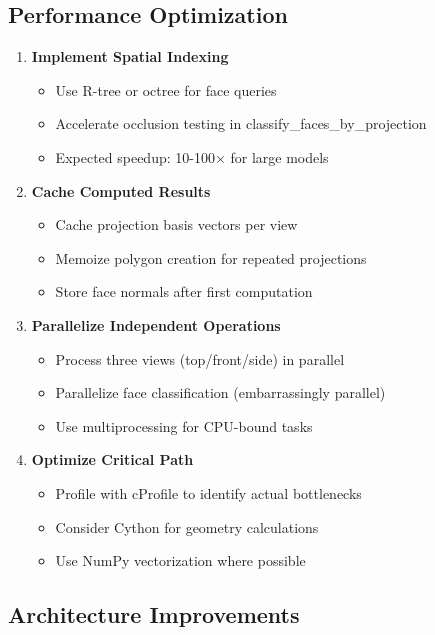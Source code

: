 \documentclass[11pt,a4paper]{article}
\begin{document}
\subsection{Performance Optimization}

\begin{enumerate}
    \item \textbf{Implement Spatial Indexing}
    \begin{itemize}
        \item Use R-tree or octree for face queries
        \item Accelerate occlusion testing in classify\_faces\_by\_projection
        \item Expected speedup: 10-100× for large models
    \end{itemize}
    
    \item \textbf{Cache Computed Results}
    \begin{itemize}
        \item Cache projection basis vectors per view
        \item Memoize polygon creation for repeated projections
        \item Store face normals after first computation
    \end{itemize}
    
    \item \textbf{Parallelize Independent Operations}
    \begin{itemize}
        \item Process three views (top/front/side) in parallel
        \item Parallelize face classification (embarrassingly parallel)
        \item Use multiprocessing for CPU-bound tasks
    \end{itemize}
    
    \item \textbf{Optimize Critical Path}
    \begin{itemize}
        \item Profile with cProfile to identify actual bottlenecks
        \item Consider Cython for geometry calculations
        \item Use NumPy vectorization where possible
    \end{itemize}
\end{enumerate}

\subsection{Architecture Improvements}
\end{document}
